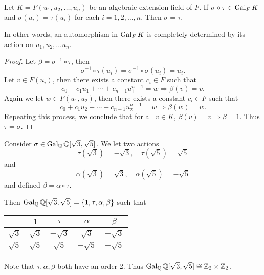 \begin{theorem}
    Let $K = F(u_1, u_2, \ldots, u_n)$ be an algebraic extension field of $F$. If 
    $\sigma \circ \tau \in \operatorname{Gal}_F K $ and $\sigma(u_i) = \tau(u_i)$ for each $i = 1,2,\ldots, n$.
    Then $\sigma = \tau$.

    In other words, an automorphism in $\operatorname{Gal}_F K$ is completely determined by its action 
    on $u_1, u_2, \ldots u_n$.
\end{theorem}
\begin{proof}
    Let $\beta = \sigma^{-1} \circ \tau$, then 
    \[
        \sigma^{-1} \circ \tau (u_i) = \sigma^{-1} \circ \sigma(u_i) = u_i.
    \]
    Let $v \in F(u_i)$, then there exists a constant $c_i \in F$ such that 
    \[
        c_0 + c_1u_1 + \cdots + c_{n-1}u^{n-1}_1 = w \Longrightarrow \beta(v) = v.
    \]
    Again we let $w \in F(u_1, u_2)$, then there exists a constant $c_i \in F$ such that 
    \[
        c_0 + c_1u_2 + \cdots + c_{n-1}u^{n-1}_2 = w \Longrightarrow \beta(w) = w.
    \]
    Repeating this process, we conclude that for all $v \in K$, $\beta(v) = v \Longrightarrow \beta = 1$.
    Thus $\tau = \sigma$.
\end{proof}

\begin{example}
    Consider $\sigma \in \operatorname{Gal}_\mathbb{Q} \mathbb{Q}[\sqrt{3}, \sqrt{5}]$. We let two actions
    \[
        \tau(\sqrt{3}) = -\sqrt{3}, \quad \tau(\sqrt{5}) = \sqrt{5}
    \]
    and
    \[
        \alpha(\sqrt{3}) = \sqrt{3}, \quad \alpha(\sqrt{5}) = -\sqrt{5}
    \]
    and defined $\beta = \alpha \circ \tau$.

    Then $\operatorname{Gal}_\mathbb{Q} \mathbb{Q}[\sqrt{3}, \sqrt{5}] = \{ 1, \tau, \alpha, \beta \}$
    such that

    \begin{center}
        \begin{tabular}{|c|c|c|c|c|}
            \hline
            & $1$ & $\tau$ & $\alpha$ & $\beta$\\
            \hline
            $\sqrt{3}$ & $\sqrt{3}$ & $-\sqrt{3}$ & $\sqrt{3}$ & $-\sqrt{3}$\\[0.225em]
            \hline
            $\sqrt{5}$ & $\sqrt{5}$ & $\sqrt{5}$ & $-\sqrt{5}$ & $-\sqrt{5}$\\
            \hline
        \end{tabular}
    \end{center}

    Note that $\tau, \alpha, \beta$ both have an order 2. Thus $\operatorname{Gal}_\mathbb{Q} \mathbb{Q}[\sqrt{3}, \sqrt{5}] \cong 
    \mathbb{Z}_2 \times \mathbb{Z}_2$.
\end{example}

